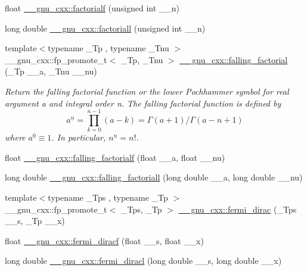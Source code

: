 \begin{DoxyCompactItemize}
float \hyperlink{group__mathsf__gnu_ga5a288283a8ed63e1d2b0145f313a5378}{\+\_\+\+\_\+gnu\+\_\+cxx\+::factorialf} (unsigned int \+\_\+\+\_\+n)
\item 
long double \hyperlink{group__mathsf__gnu_ga0904e504fdc3c8b9b6f5c66a73531584}{\+\_\+\+\_\+gnu\+\_\+cxx\+::factoriall} (unsigned int \+\_\+\+\_\+n)
\item 
{\footnotesize template$<$typename \+\_\+\+Tp , typename \+\_\+\+Tnu $>$ }\\\+\_\+\+\_\+gnu\+\_\+cxx\+::fp\+\_\+promote\+\_\+t$<$ \+\_\+\+Tp, \+\_\+\+Tnu $>$ \hyperlink{group__mathsf__gnu_ga3cc8eb6068c7155ec48b40e20160c5c0}{\+\_\+\+\_\+gnu\+\_\+cxx\+::falling\+\_\+factorial} (\+\_\+\+Tp \+\_\+\+\_\+a, \+\_\+\+Tnu \+\_\+\+\_\+nu)
\begin{DoxyCompactList}\small\item\em Return the falling factorial function or the lower Pochhammer symbol for real argument {\ttfamily a} and integral order {\ttfamily n}. The falling factorial function is defined by \[ a^{\underline{n}} = \prod_{k=0}^{n-1} (a - k) = \Gamma(a + 1) / \Gamma(a - n + 1) \] where $ a^{\underline{0}} \equiv 1 $. In particular, $ n^{\underline{n}} = n! $. \end{DoxyCompactList}\item 
float \hyperlink{group__mathsf__gnu_gaf32abbc790bfa870725728e5470de532}{\+\_\+\+\_\+gnu\+\_\+cxx\+::falling\+\_\+factorialf} (float \+\_\+\+\_\+a, float \+\_\+\+\_\+nu)
\item 
long double \hyperlink{group__mathsf__gnu_gab816c3bcbe00595881799ce969475085}{\+\_\+\+\_\+gnu\+\_\+cxx\+::falling\+\_\+factoriall} (long double \+\_\+\+\_\+a, long double \+\_\+\+\_\+nu)
\item 
{\footnotesize template$<$typename \+\_\+\+Tps , typename \+\_\+\+Tp $>$ }\\\+\_\+\+\_\+gnu\+\_\+cxx\+::fp\+\_\+promote\+\_\+t$<$ \+\_\+\+Tps, \+\_\+\+Tp $>$ \hyperlink{group__mathsf__gnu_ga5468fbaed5cb8384cff7cfb9d2188d1a}{\+\_\+\+\_\+gnu\+\_\+cxx\+::fermi\+\_\+dirac} (\+\_\+\+Tps \+\_\+\+\_\+s, \+\_\+\+Tp \+\_\+\+\_\+x)
\item 
float \hyperlink{group__mathsf__gnu_gacf7f49b2b7bf50fd37d939236712cbe2}{\+\_\+\+\_\+gnu\+\_\+cxx\+::fermi\+\_\+diracf} (float \+\_\+\+\_\+s, float \+\_\+\+\_\+x)
\item 
long double \hyperlink{group__mathsf__gnu_ga3876af54a92853036cc88ec6b8ea5d67}{\+\_\+\+\_\+gnu\+\_\+cxx\+::fermi\+\_\+diracl} (long double \+\_\+\+\_\+s, long double \+\_\+\+\_\+x)
\item 

\end{DoxyCompactItemize}
